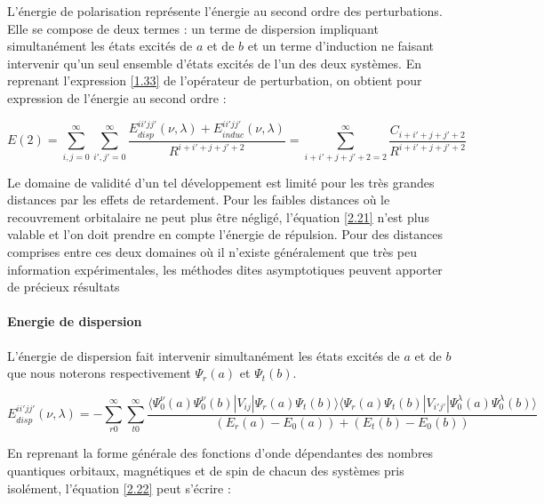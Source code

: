 L'énergie de polarisation représente l'énergie au second ordre des perturbations. Elle se compose de deux termes : un terme de dispersion impliquant simultanément les états excités de $a$ et de $b$ et un terme d'induction ne faisant intervenir qu'un seul ensemble d'états excités de l'un des deux systèmes. En reprenant l'expression \ref{1.33} de l'opérateur de perturbation, on obtient pour expression de l'énergie au second ordre : 
   
\begin{equation}
E(2) = \sum_{i,j=0}^{\infty} \sum_{i',j'=0}^{\infty} \frac{E_{disp}^{ii'jj'} (\nu , \lambda) + E_{induc}^{ii'jj'}(\nu , \lambda)}{R^{i+i'+j+j'+2}} = \sum_{i+i'+j+j'+2=2}^{\infty} \frac{C_{i+i'+j+j'+2}}{R^{i+i'+j+j'+2}} \label{2.21}
\end{equation}
   
Le domaine de validité d'un tel développement est limité pour les très grandes distances par les effets de retardement. Pour les faibles distances où le recouvrement orbitalaire ne peut plus être négligé, l'équation \ref{2.21} n'est plus valable et l'on doit prendre en compte l'énergie de répulsion. Pour des distances comprises entre ces deux domaines où il n'existe généralement que très peu information expérimentales, les méthodes dites asymptotiques peuvent apporter de précieux résultats


\paragraph{Energie de dispersion}

L'énergie de dispersion fait intervenir simultanément les états excités de $a$ et de $b$ que nous noterons respectivement $\Psi_{r}(a)$ et $\Psi_{t}(b)$.
   	
\begin{equation}
   E_{disp}^{ii'jj'} (\nu , \lambda) = - \sum_{r0}^{\infty} \sum_{t0}^{\infty} \frac{\langle \Psi_{0}^{\nu} (a) \Psi_{0}^{\nu} (b)| V_{ij}|\Psi_{r} (a) \Psi_{t} (b) \rangle  \langle \Psi_{r} (a) \Psi_{t} (b) |V_{i'j'}| \Psi_{0}^{\lambda} (a) \Psi_{0}^{\lambda}(b) \rangle}{(E_{r} (a) - E_{0} (a)) + (E_{t} (b) - E_{0} (b))} \label{2.22}
\end{equation}
   	   	
En reprenant la forme générale des fonctions d'onde dépendantes des nombres quantiques orbitaux, magnétiques et de spin de chacun des systèmes pris isolément, l'équation \ref{2.22} peut s'écrire : 
   	
